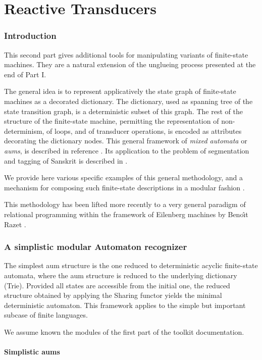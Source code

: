 \part{Reactive Transducers}

\section{Introduction}

This second part gives additional tools for manipulating variants of finite-state machines.
They are a natural extension of the unglueing process presented at the end of Part I.

The general idea is to represent applicatively the state graph of finite-state machines
as a decorated dictionary. The dictionary, used as spanning tree of the state transition graph,
is a deterministic subset of this graph. The rest of the structure of the finite-state machine,
permitting the representation of non-determinism, of loops, and of transducer operations,
is encoded as attributes decorating the dictionary nodes. This general framework
of {\sl mixed automata} or {\sl aums}, is described in reference \cite{2003-Huet-3}. 
Its application to the problem of segmentation and tagging of Sanskrit is described
in \cite{2004-Huet-1}. 

We provide here various specific examples of this general methodology, and a mechanism
for composing such finite-state descriptions in a modular fashion \cite{2006-Huet-Razet}.

This methodology has been lifted more recently
to a very general paradigm of relational 
programming within the framework of Eilenberg machines by Beno{\^\i}t Razet
\cite{2008-Huet-Razet, Razet08a, Razet08b, Razet09}.

\section{A simplistic modular Automaton recognizer}

The simplest aum structure is the one reduced to deterministic acyclic finite-state automata,
where the aum structure is reduced to the underlying dictionary (Trie). Provided all
states are accessible from the initial one, the reduced structure obtained by applying the
Sharing functor yields the minimal deterministic automaton. This framework applies to the
simple but important subcase of finite languages.

We assume known the modules of the first part of the toolkit documentation. 

\subsection{Simplistic aums}

